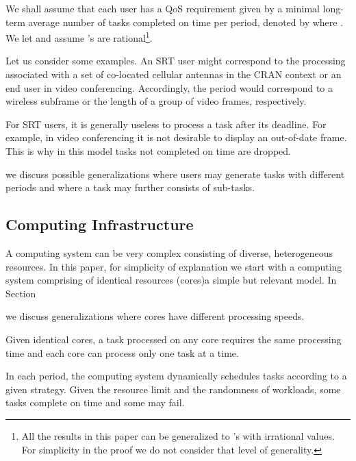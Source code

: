 \documentclass[prodmode,acmtompecs]{acmsmall}
\newcommand{\myComments}[1]{}
\newif\ifinfocom
\newif\iftompecs
\newif\ifdissertation
\newcommand{\infocomStart}{\ifinfocom \myComments{Infocom: }}
\newcommand{\tompecsStart}{\iftompecs \myComments{TOMPECS version: }}
\newcommand{\dissertationStart}{\ifdissertation  \myComments{Dissertation version: }}
\newcommand{\commentEnd}{\myComments{End}}
\begin{document}
We shall assume that each user  has a QoS requirement given by a minimal long-term average number of tasks completed on time per period, denoted by  where . 
We let  and 
assume 's are rational\footnote{All the results in this paper can be generalized to 's with irrational values. For simplicity in the proof we do not consider that level of generality. }.

Let us consider some examples. An SRT user might correspond to the processing associated with a set of co-located cellular antennas in the CRAN context or an end user in video conferencing. 
Accordingly, the period  would correspond to a wireless subframe or the length of a group of video frames, respectively. 
\dissertationStart
In CRAN each antenna generates a task associated with each subframe. Depending on the traffic and wireless channels, the tasks may take different CPU time and resources to process. 
\commentEnd\fi
For SRT users, it is generally useless to process a task after its deadline. For example, in video conferencing it is not desirable to display an out-of-date frame. This is why in this model tasks not completed on time are dropped. 
\infocomStart
In the extended version of this paper \cite{EXT}, 
\commentEnd\fi
\tompecsStart
In Section \ref{section_possible_generalizations}, 
\commentEnd\fi
we discuss possible generalizations where users may generate tasks with different periods and where a task may further consists of sub-tasks. 

\subsection{Computing Infrastructure}
A computing system can be very complex consisting of diverse, heterogeneous resources. 
In this paper, for simplicity of explanation we start with a computing system comprising of  identical resources (cores)\textemdash a simple but relevant model. 
In Section 
\infocomStart
\ref{section_generalizations} 
\commentEnd\fi
\tompecsStart
\ref{section_possible_generalizations}
\commentEnd\fi
we discuss generalizations where cores have different processing speeds. 

Given  identical cores, a task processed on any core requires the same processing time and each core can process only one task at a time. 
\dissertationStart
In this context, the workload of a task refers to the required core time to fully complete the task. 
\commentEnd\fi
In each period, the computing system dynamically schedules tasks according to a given strategy. Given the resource limit and the randomness of workloads, some tasks complete on time and some may fail. 
\end{document}
